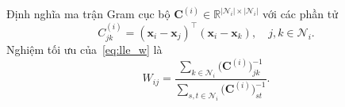 \begin{theorem}
\label{thm:lle_w}
Định nghĩa ma trận Gram cục bộ $\mathbf{C}^{(i)}\in\mathbb{R}^{|\mathcal{N}_i|
\times |\mathcal{N}_i|}$ với các phần tử
\begin{equation}
  C^{(i)}_{jk} = (\mathbf{x}_i - \mathbf{x}_j)^\top(\mathbf{x}_i - \mathbf{x}_k),
  \quad j,k\in\mathcal{N}_i.
\end{equation}
Nghiệm tối ưu của~\eqref{eq:lle_w} là
\begin{equation}\label{eq:lle_weights}
  W_{ij}
  = \frac{\displaystyle\sum_{k\in\mathcal{N}_i}\bigl(\mathbf{C}^{(i)}\bigr)^{-1}_{jk}}
         {\displaystyle\sum_{s,t\in\mathcal{N}_i}\bigl(\mathbf{C}^{(i)}\bigr)^{-1}_{st}}.
\end{equation}
\end{theorem}
